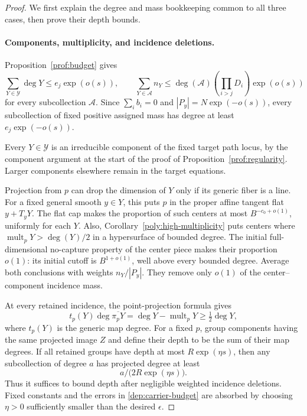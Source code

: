 \begin{proof}
We first explain the degree and mass bookkeeping common to all three
cases, then prove their depth bounds.

\paragraph{Components, multiplicity, and incidence deletions.}
Proposition~\ref{prof:budget} gives
\begin{equation}\label{dep:carrier-budget}
 \sum_{Y\in\mathcal Y}\deg Y\le e_j\exp(o(s)),
 \qquad
 \sum_{Y\in\mathcal A} n_Y
 \le \deg(\mathcal A)\left(\prod_{i>j}D_i\right)\exp(o(s))
\end{equation}
for every subcollection $\mathcal A$.
Since $\sum_i b_i=0$ and $|P_y|=N\exp(-o(s))$, every subcollection
of fixed positive assigned mass has degree at least
$e_j\exp(-o(s))$.

Every $Y\in\mathcal Y$ is an irreducible component of the fixed target
path locus, by the component argument at the start of the proof of
Proposition~\ref{prof:regularity}. Larger components elsewhere remain
in the target equations.

Projection from $p$ can drop the dimension of $Y$ only if its generic
fiber is a line. For a fixed general smooth $y\in Y$, this puts $p$
in the proper affine tangent flat $y+T_yY$. The flat cap makes the
proportion of such centers at most $B^{-c_0+o(1)}$, uniformly for each
$Y$. Also, Corollary~\ref{poly:high-multiplicity} puts centers where
$\operatorname{mult}_pY>\deg(Y)/2$ in a hypersurface of bounded degree.
The initial full-dimensional no-capture property of the center piece
makes their proportion $o(1)$: its initial cutoff is $B^{1+o(1)}$,
well above every bounded degree. Average both conclusions with weights
$n_Y/|P_y|$. They remove only $o(1)$ of the center--component incidence
mass.

At every retained incidence, the point-projection formula gives
\begin{equation}\label{dep:projection-formula}
 t_p(Y)\deg\overline{\pi_pY}
       =\deg Y-\operatorname{mult}_pY
       \ge\tfrac12\deg Y,
\end{equation}
where $t_p(Y)$ is the generic map degree. For a fixed $p$, group
components having the same projected image $Z$ and define their depth
to be the sum of their map degrees. If all retained groups have depth
at most $R\exp(\eta s)$, then any subcollection of degree $a$ has
projected degree at least
\begin{equation}\label{dep:depth-to-degree}
 a\big/\bigl(2R\exp(\eta s)\bigr).
\end{equation}
Thus it suffices to bound depth after negligible weighted incidence
deletions. Fixed constants and the errors in
\eqref{dep:carrier-budget} are absorbed by choosing
$\eta>0$ sufficiently smaller than the desired $\epsilon$.


\end{proof}
